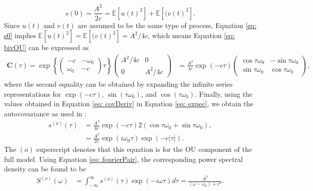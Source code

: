 \documentclass{stat572Style}
\begin{document}
\begin{equation}
\label{eq: s0}
s(0) = \frac{A^{2}}{2c} =  \mathbb{E}[u(t)^{2}] + \mathbb{E}[(v(t)^{2}]. 
\end{equation}
Since $u(t)$ and $v(t)$ are assumed to be the same type of process, Equation \eqref{eq: s0} implies $\mathbb{E}[u(t)^{2}] =\mathbb{E}[(v(t)^{2}] = A^{2}/4c$, which means Equation \eqref{eq: bivOU} can be expressed as 
\begin{align}
\label{eq: covDeriv}
 \boldsymbol{C}(\tau) =  \exp \left\{ \left( \begin{array}{cc} -c & -\omega_{0} \\ \omega_{0} & -c \end{array} \right)\tau \right\} \left( \begin{array}{cc} A^{2}/4c & 0 \\ 0 & A^{2}/4c \end{array} \right)  &= 
\frac{A^{2}}{4c} \exp (-c \tau) \left( \begin{array}{cc} \cos \tau \omega_{0} & - \sin \tau \omega_{0} \\ \sin \tau \omega_{0} & \cos \tau \omega_{0}  \end{array} \right),
\end{align}
where the second equality can be obtained by expanding the infinite series representations for $\exp(-c \tau)$, $\sin(\tau \omega_{0})$, and $\cos( \tau \omega_{0})$. 
Finally, using the values obtained in Equation \eqref{eq: covDeriv} in Equation \eqref{eq: expec}, we obtain the autocovariance  as used in \citet{Sykulski2016}:
\begin{align}
\label{eq: ouAC} \nonumber
s^{(o)}(\tau) & = \frac{A^{2}}{4c} \exp(-c\tau) 2(\cos \tau \omega_{0} + \sin \tau \omega_{0}), \\
&= \frac{A^{2}}{2c} \exp(i \omega_{0}\tau) \exp(-c|\tau|).
\end{align}
 The $(o)$ superscript denotes that this equation is for the OU component of the full model. Using Equation \eqref{eq: fourierPair}, the corresponding power spectral density can be found to be\begin{align}
\label{eq:ouPSD}
S^{(o)}(\omega) &=  \int_{-\infty}^{\infty} s^{(o)}(\tau) \exp (-i \omega \tau) d \tau = \frac{A^{2}}{(\omega - \omega_{0}) + c^{2}}. 
\end{align}
\end{document}
